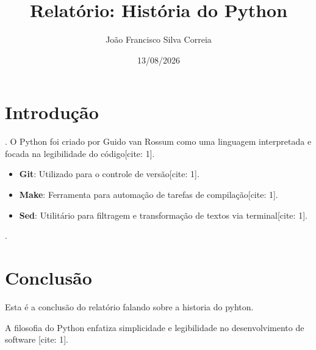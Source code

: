 \documentclass{article}
\title{Relatório: História do Python}
\author{João Francisco Silva Correia}
\date{13/08/2026}
\begin{document}
\maketitle

\section{Introdução}.
O Python foi criado por Guido van Rossum como uma linguagem interpretada e focada na legibilidade do código[cite: 1].

\begin{itemize}
    \item \textbf{Git}: Utilizado para o controle de versão[cite: 1].
    \item \textbf{Make}: Ferramenta para automação de tarefas de compilação[cite: 1].
    \item \textbf{Sed}: Utilitário para filtragem e transformação de textos via terminal[cite: 1].
\end{itemize}.

\section{Conclusão}
Esta é a conclusão do relatório falando sobre a historia do pyhton.

A filosofia do Python enfatiza simplicidade e legibilidade no desenvolvimento de software \cite{python}[cite: 1].



\end{document}

